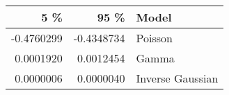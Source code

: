 \begin{table}[ht]
\centering
\begin{tabular}{rrl}
  \hline
5 \% & 95 \% & Model \\ 
  \hline
-0.4760299 & -0.4348734 & Poisson \\ 
  0.0001920 & 0.0012454 & Gamma \\ 
  0.0000006 & 0.0000040 & Inverse Gaussian \\ 
   \hline
\end{tabular}
\end{table}
